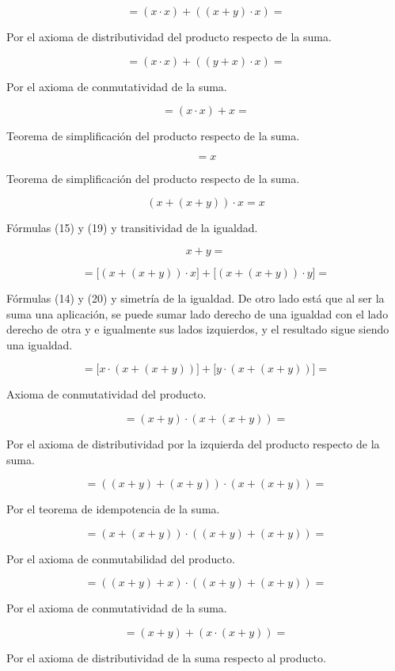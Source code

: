 \[{= {{({x \cdot x})} + {({{({x + y})} \cdot x})}}} =\]

Por el axioma de distributividad del producto respecto de la suma.

\[{= {{({x \cdot x})} + {({{({y + x})} \cdot x})}}} =\]

Por el axioma de conmutatividad de la suma.

\[{= {{({x \cdot x})} + x}} =\]

Teorema de simplificación del producto respecto de la suma.

\[= x\]

Teorema de simplificación del producto respecto de la suma.

\[{{({x + {({x + y})}})} \cdot x} = x\]

Fórmulas (15) y (19) y transitividad de la igualdad.

\[{}{{x + y} =}\]

\[{= {{\lbrack{{({x + {({x + y})}})} \cdot x}\rbrack} + {\lbrack{{({x + {({x + y})}})} \cdot y}\rbrack}}} =\]

Fórmulas (14) y (20) y simetría de la igualdad. De otro lado está que al
ser la suma una aplicación, se puede sumar lado derecho de una igualdad
con el lado derecho de otra y e igualmente sus lados izquierdos, y el
resultado sigue siendo una igualdad.

\[{= {{\lbrack{x \cdot {({x + {({x + y})}})}}\rbrack} + {\lbrack{y \cdot {({x + {({x + y})}})}}\rbrack}}} =\]

Axioma de conmutatividad del producto.

\[{= {{({x + y})} \cdot {({x + {({x + y})}})}}} =\]

Por el axioma de distributividad por la izquierda del producto respecto
de la suma.

\[{= {\left( {{({x + y})} + {({x + y})}} \right) \cdot {({x + {({x + y})}})}}} =\]

Por el teorema de idempotencia de la suma.

\[{= {\left( {x + {({x + y})}} \right) \cdot \left( {{({x + y})} + {({x + y})}} \right)}} =\]

Por el axioma de conmutabilidad del producto.

\[{= {\left( {{({x + y})} + x} \right) \cdot \left( {{({x + y})} + {({x + y})}} \right)}} =\]

Por el axioma de conmutatividad de la suma.

\[{= {{({x + y})} + {({x \cdot {({x + y})}})}}} =\]

Por el axioma de distributividad de la suma respecto al producto.

